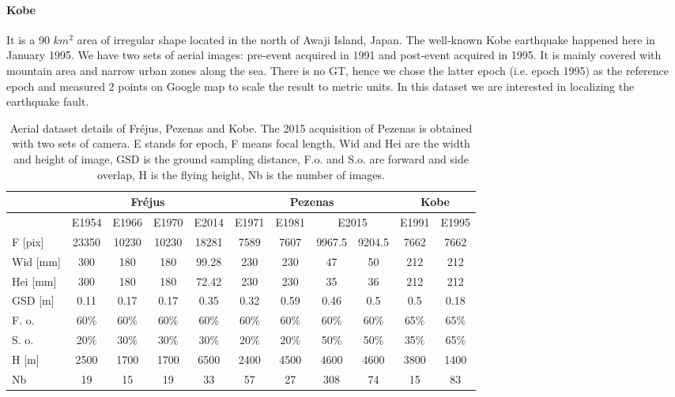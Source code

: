 \paragraph{Kobe} It is a 90 $km^2$ area of irregular shape located in the north of Awaji Island, Japan. The well-known Kobe earthquake happened here in January 1995. We have two sets of aerial images: pre-event acquired in 1991 and post-event acquired in 1995. It is mainly covered with mountain area and narrow urban zones along the sea. There is no \ac{GT}, hence we chose the latter epoch (i.e. epoch 1995) as the reference epoch and measured 2 points on Google map to scale the result to metric units. In this dataset we are interested in localizing the earthquake fault.

\begin{table}[htbp]
    \scriptsize %
    \centering
    \begin{tabular}{||l|c|c|c|c||c|c|c|c||c|c||}\hline
        &\multicolumn{4}{c||}{Fr{\'e}jus}&\multicolumn{4}{c||}{Pezenas}&\multicolumn{2}{c||}{Kobe}\\\hline
                &E1954&E1966&E1970&E2014&E1971&E1981&\multicolumn{2}{c||}{E2015}&E1991&E1995\\\hline\hline
        F [pix]&23350&10230&10230&\color{black}18281&7589&7607&9967.5&9204.5&7662&7662\\
        Wid [mm]&300&180&180&99.28&230&230&47&50&212&212\\
        Hei [mm]&300&180&180&72.42&230&230&35&36&212&212\\
        GSD [m]&\color{black}0.11&\color{black}0.17&0.17&0.35&0.32&0.59&0.46&0.5&0.5&0.18\\
        F. o.&60\%&60\%&60\%&60\%&   60\%&60\%&60\%&60\%&   65\%&65\%\\
        S. o.&20\%&30\%&30\%&30\%&   20\%&20\%&50\%&50\%&   35\%&65\%\\
        H  [m]&2500&1700&1700&6500&2400&4500&4600&4600&3800&1400\\
        Nb &19&15&19&33&57&27&308&74&15&83\\\hline
    \end{tabular}
    \caption{Aerial dataset details of Fr{\'e}jus, Pezenas and Kobe. The 2015 acquisition of Pezenas is obtained with two sets of camera. E stands for epoch, F means focal length, Wid and Hei are the width and height of image, GSD is the ground sampling distance, F.o. and S.o. are forward and side overlap, H is the flying height, Nb is the number of images.}
    \label{AerialData}
\end{table}

